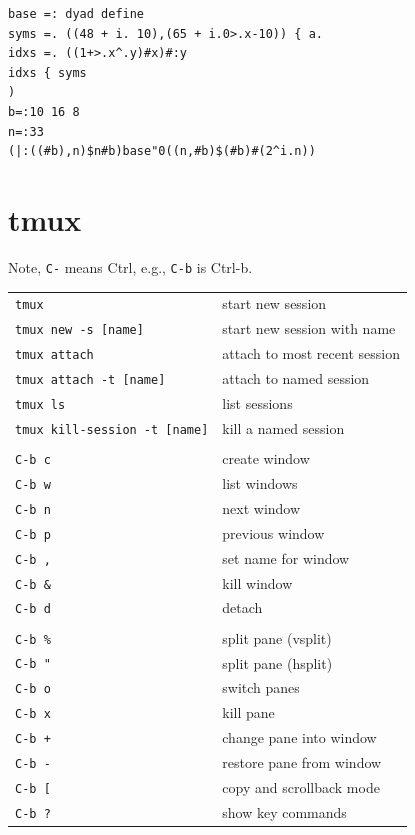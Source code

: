 \documentclass[10pt,twoside,openright]{memoir}
\begin{document}
{\footnotesize
\begin{verbatim}
base =: dyad define
syms =. ((48 + i. 10),(65 + i.0>.x-10)) { a.
idxs =. ((1+>.x^.y)#x)#:y
idxs { syms
)
b=:10 16 8
n=:33
(|:((#b),n)$n#b)base"0((n,#b)$(#b)#(2^i.n))
\end{verbatim}
}


\chapter{tmux}

{\footnotesize

Note, \texttt{C-} means Ctrl, e.g., \texttt{C-b} is Ctrl-b.

\vskip 0.2in

\noindent \begin{tabular}{ll}
\texttt{tmux} & start new session \\
\texttt{tmux new -s [name]} & start new session with name \\
\texttt{tmux attach} & attach to most recent session \\
\texttt{tmux attach -t [name]} & attach to named session \\
\texttt{tmux ls} & list sessions \\
\texttt{tmux kill-session -t [name]} & kill a named session \\
& \\
\texttt{C-b c} & create window \\
\texttt{C-b w} & list windows \\
\texttt{C-b n} & next window \\
\texttt{C-b p} & previous window \\
\texttt{C-b ,} & set name for window \\
\texttt{C-b \&} & kill window \\
\texttt{C-b d} & detach \\
& \\
\texttt{C-b \%} & split pane (vsplit) \\
\texttt{C-b "} & split pane (hsplit) \\
\texttt{C-b o} & switch panes \\
\texttt{C-b x} & kill pane \\
\texttt{C-b +} & change pane into window \\
\texttt{C-b -} & restore pane from window \\
\texttt{C-b [} & copy and scrollback mode \\
\texttt{C-b ?} & show key commands \\
\end{tabular}
}
\end{document}
